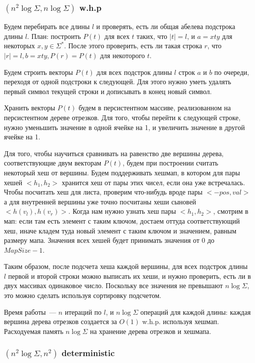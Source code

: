 {

\subsubsection{$(n^2 \log \Sigma, n \log \Sigma)$ w.h.p}

Будем перебирать все длины $l$ и проверять, есть ли общая абелева подстрока длины $l$.
План: построить $P(t)$ для всех $t$ таких, что $|t|=l$, и $a=xty$ для некоторых $x, y \in \Sigma^*$. После этого проверить, есть ли такая строка $r$, что $|r|=l, b=xty, P(r)=P(t)$ для некоторого $t$.

Будем строить векторы $P(t)$ для всех подстрок длины $l$ строк $a$ и $b$ по очереди, переходя от одной подстроки к следующей. Для этого нужно уметь удалять первый символ текущей строки и дописывать в конец новый символ.

Хранить векторы $P(t)$ будем в персистентном массиве, реализованном на персистентном дереве отрезков. Для того, чтобы перейти к следующей строке, нужно уменьшить значение в одной ячейке на 1, и увеличить значение в другой ячейке на 1.

Для того, чтобы научиться сравнивать на равенство две вершины дерева, соответствующие двум векторам $P(t)$, будем при построении считать некоторый хеш от вершины. Будем поддерживать хешмап, в котором для пары хешей $<h_1, h_2>$ хранится хеш от пары этих чисел, если она уже встречалась. Чтобы посчитать хеш для листа, проверим что-нибудь вроде пары $<-pos, val>$ а для внутренней вершины уже точно посчитаны хеши сыновей $<h(v_l), h(v_r)>$. Когда нам нужно узнать хеш пары $<h_1, h_2>$, смотрим в мап: если там есть элемент с таким ключом, достаем оттуда соответствующий хеш, иначе кладем туда новый элемент с таким ключом и значением, равным размеру мапа. Значения всех хешей будет принимать значения от $0$ до $MapSize - 1$.

Таким образом, после подсчета хеша каждой вершины, для всех подстрок длины $l$ первой и второй строки можно выписать их хеши, и нужно проверить, есть ли в двух массивах одинаковое число. Поскольку все значения не превышают $n \log \Sigma$, это можно сделать используя сортировку подсчетом.

Время работы~--- $n$ итераций по $l$, и $n \log \Sigma$ операций для каждой длины: каждая вершина дерева отрезков создается за $O(1)$ w.h.p. используя хешмап. Расходуемая память $n \log \Sigma$ на хранение дерева отрезков и хешмапа.


\subsubsection{$(n^2 \log \Sigma, n^2)$ deterministic}

}
